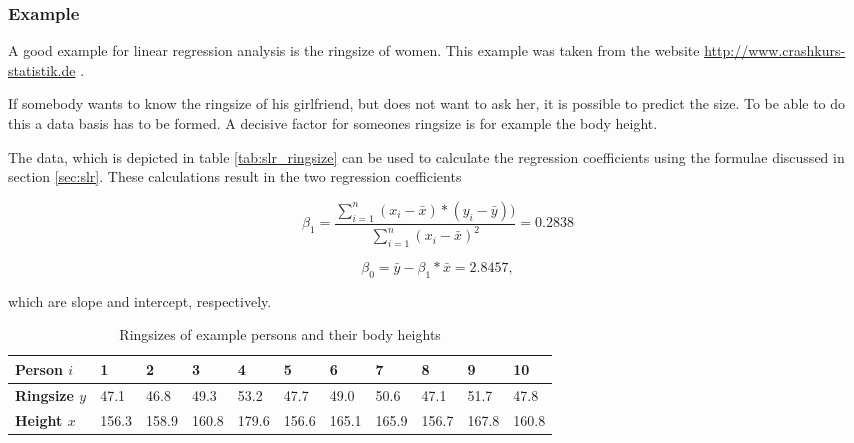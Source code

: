 \subsubsection{Example}

A good example for linear regression analysis is the ringsize of women. This example was taken from the website \url{http://www.crashkurs-statistik.de} \autocite{CrashkursSLR, CrashkursMLR}.

If somebody wants to know the ringsize of his girlfriend, but does not want to ask her, it is possible to predict the size. To be able to do this a data basis has to be formed. A decisive factor for someones ringsize is for example the body height.

The data, which is depicted in table \vref{tab:slr_ringsize} can be used to calculate the regression coefficients using the formulae discussed in section \vref{sec:slr}. These calculations result in the two regression coefficients

\begin{equation}
    \beta_1 = \frac{\sum_{i=1}^{n} (x_i - \bar{x}) * (y_i - \bar{y}))}{\sum_{i=1}^{n} (x_i - \bar{x})^2} = 0.2838
\end{equation}

\begin{equation}
    \beta_0 = \bar{y} - \beta_1 * \bar{x} = 2.8457,
\end{equation}

which are slope and intercept, respectively.

\begin{table}[h]
    \centering
    \begin{tabular}{|l|l|l|l|l|l|l|l|l|l|l|}
    \hline
    \textbf{Person $ i $}    & \textbf{1} & \textbf{2} & \textbf{3} & \textbf{4} & \textbf{5} & \textbf{6} & \textbf{7} & \textbf{8} & \textbf{9} & \textbf{10} \\ \hline
    \textbf{Ringsize $ y $}  & 47.1       & 46.8       & 49.3       & 53.2       & 47.7       & 49.0       & 50.6       & 47.1       & 51.7       & 47.8        \\ \hline
    \textbf{Height $ x $}    & 156.3      & 158.9      & 160.8      & 179.6      & 156.6      & 165.1      & 165.9      & 156.7      & 167.8      & 160.8       \\ \hline
    \end{tabular}
    \caption{Ringsizes of example persons and their body heights}
    \label{tab:slr_ringsize}
\end{table}

